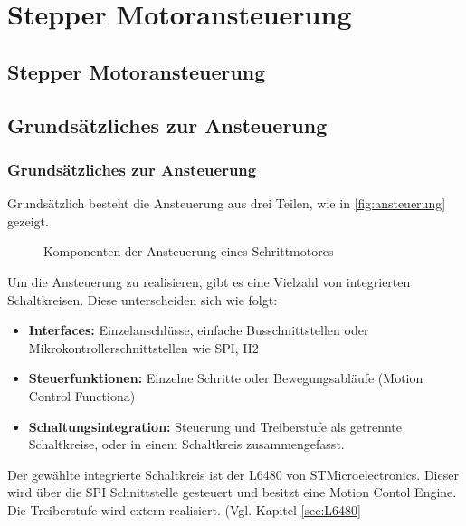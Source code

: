 \ifSTANDALONE
\section{Stepper Motoransteuerung}
\fi
\ifEMBED
\subsection{Stepper Motoransteuerung}
\fi

\ifEMBED
    \BLDCcollab
\fi
    \ifSTANDALONE
    \subsection{Grundsätzliches zur Ansteuerung}\label{subsec:Ansteuerung}
    \fi
    \ifEMBED
    \subsubsection{Grundsätzliches zur Ansteuerung}\label{subsec:Ansteuerung}
    \fi
    	Grundsätzlich besteht die Ansteuerung aus drei Teilen, wie in \autoref*{fig:ansteuerung} gezeigt. 
    	\begin{figure}[h!]
    		\centering
    		\caption{Komponenten der Ansteuerung eines Schrittmotores}
    		\label{fig:ansteuerung}
    	\end{figure}
        Um die Ansteuerung zu realisieren, gibt es eine Vielzahl von integrierten Schaltkreisen. Diese unterscheiden sich wie folgt: 
        \begin{itemize}
        	\item \textbf{Interfaces:} Einzelanschlüsse, einfache Busschnittstellen oder Mikrokontrollerschnittstellen wie SPI, II2
        	\item \textbf{Steuerfunktionen:} Einzelne Schritte oder Bewegungsabläufe (Motion Control Functiona)
        	\item \textbf{Schaltungsintegration:} Steuerung und Treiberstufe als getrennte Schaltkreise, oder in einem Schaltkreis zusammengefasst. 
        \end{itemize}
        Der gewählte integrierte Schaltkreis ist der L6480 von STMicroelectronics. Dieser wird über die SPI Schnittstelle gesteuert und besitzt eine Motion Contol Engine. Die Treiberstufe wird extern realisiert. (Vgl. Kapitel \ref{sec:L6480} 
        
